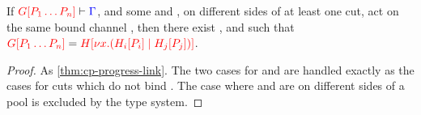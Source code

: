 \begin{lemmaB}\label{thm:nc-progress-beta}
  If $\seq[{ \cpPlug{G}{P_1 \dots P_n} }]{ \Gamma }$, and some  and
  , on different sides of at least one cut, act on the same bound
  channel , then there exist ,  and  such that 
  \(
  \tm{\cpPlug{G}{P_1 \dots P_n}} =
  \tm{\cpPlug{H}{\cpCut{x}{\cpPlug{H_i}{P_i}}{\cpPlug{H_j}{P_j}}}}
  \).
\end{lemmaB}
\begin{proof}
  As \cref{thm:cp-progress-link}.
  The two cases for
  and
  are handled exactly as the cases for cuts which do not bind .
  The case where  and  are on different sides of a pool is
  excluded by the type system.
\end{proof}
